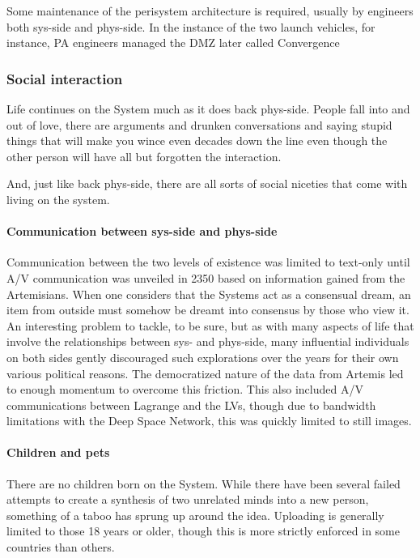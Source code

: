 Some maintenance of the perisystem architecture is required, usually by engineers both sys-side and phys-side. In the instance of the two launch vehicles, for instance, PA engineers managed the DMZ {later called Convergence}

\subsubsection{Social interaction}

Life continues on the System much as it does back phys-side. People fall into and out of love, there are arguments and drunken conversations and saying stupid things that will make you wince even decades down the line even though the other person will have all but forgotten the interaction.

And, just like back phys-side, there are all sorts of social niceties that come with living on the system.

\paragraph{Communication between sys-side and phys-side}

Communication between the two levels of existence was limited to text-only until A/V communication was unveiled in 2350 based on information gained from the Artemisians. When one considers that the Systems act as a consensual dream, an item from outside must somehow be dreamt into consensus by those who view it. An interesting problem to tackle, to be sure, but as with many aspects of life that involve the relationships between sys- and phys-side, many influential individuals on both sides gently discouraged such explorations over the years for their own various political reasons. The democratized nature of the data from Artemis led to enough momentum to overcome this friction. This also included A/V communications between Lagrange and the LVs, though due to bandwidth limitations with the Deep Space Network, this was quickly limited to still images.

\paragraph{Children and pets}

There are no children born on the System. While there have been several failed attempts to create a synthesis of two unrelated minds into a new person, something of a taboo has sprung up around the idea. Uploading is generally limited to those 18 years or older, though this is more strictly enforced in some countries than others.

